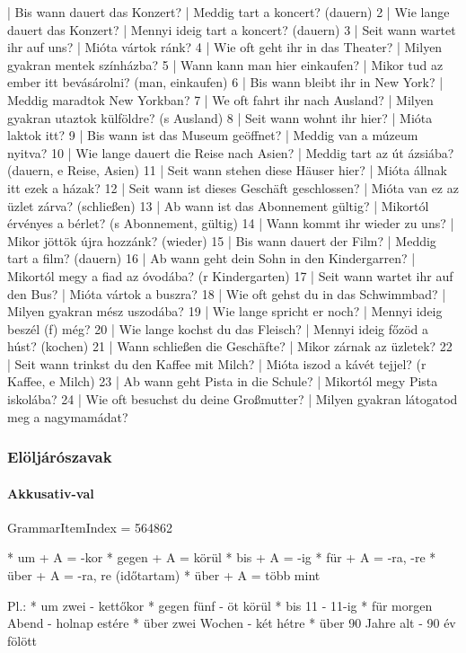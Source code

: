 \documentclass{article}
\newenvironment{desc}{\verbatim}{\endverbatim}
\newenvironment{exmp}{\verbatim}{\endverbatim}
\begin{document}
\begin{exmp}
1 | Bis wann dauert das Konzert? | Meddig tart a koncert? (dauern)
2 | Wie lange dauert das Konzert? | Mennyi ideig tart a koncert? (dauern)
3 | Seit wann wartet ihr auf uns? | Mióta vártok ránk?
4 | Wie oft geht ihr in das Theater? | Milyen gyakran mentek színházba?
5 | Wann kann man hier einkaufen? | Mikor tud az ember itt bevásárolni? (man, einkaufen)
6 | Bis wann bleibt ihr in New York? | Meddig maradtok New Yorkban?
7 | We oft fahrt ihr nach Ausland? | Milyen gyakran utaztok külföldre? (s Ausland)
8 | Seit wann wohnt ihr hier? | Mióta laktok itt?
9 | Bis wann ist das Museum geöffnet? | Meddig van a múzeum nyitva?
10 | Wie lange dauert die Reise nach Asien? | Meddig tart az út ázsiába? (dauern, e Reise, Asien)
11 | Seit wann stehen diese Häuser hier? | Mióta állnak itt ezek a házak?
12 | Seit wann ist dieses Geschäft geschlossen? | Mióta van ez az üzlet zárva? (schließen)
13 | Ab wann ist das Abonnement gültig? | Mikortól érvényes a bérlet? (s Abonnement, gültig)
14 | Wann kommt ihr wieder zu uns? | Mikor jöttök újra hozzánk? (wieder)
15 | Bis wann dauert der Film? | Meddig tart a film? (dauern)
16 | Ab wann geht dein Sohn in den Kindergarren? | Mikortól megy a fiad az óvodába? (r Kindergarten)
17 | Seit wann wartet ihr auf den Bus? | Mióta vártok a buszra?
18 | Wie oft gehst du in das Schwimmbad? | Milyen gyakran mész uszodába?
19 | Wie lange spricht er noch? | Mennyi ideig beszél (f) még?
20 | Wie lange kochst du das Fleisch? | Mennyi ideig főzöd a húst? (kochen)
21 | Wann schließen die Geschäfte? | Mikor zárnak az üzletek?
22 | Seit wann trinkst du den Kaffee mit Milch? | Mióta iszod a kávét tejjel? (r Kaffee, e Milch) 
23 | Ab wann geht Pista in die Schule? | Mikortól megy Pista iskolába?
24 | Wie oft besuchst du deine Großmutter? | Milyen gyakran látogatod meg a nagymamádat?
\end{exmp}

\subsubsection{Elöljárószavak}

\paragraph{Akkusativ-val}

GrammarItemIndex = 564862

\begin{desc}
* um + A = -kor
* gegen + A = körül
* bis + A = -ig
* für + A = -ra, -re
* über + A = -ra, re (időtartam)
* über + A = több mint

Pl.: * um zwei - kettőkor
* gegen fünf - öt körül
* bis 11 - 11-ig
* für morgen Abend - holnap estére
* über zwei Wochen - két hétre
* über 90 Jahre alt - 90 év fölött
\end{desc}
\end{document}

